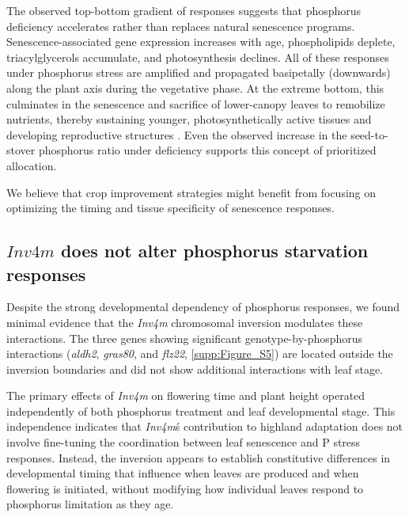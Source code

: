 \documentclass[9pt,twocolumn,twoside]{rilabRxiv}
\newcommand{\invfour}{\textit{Inv4m}\xspace}
\begin{document}
The observed top-bottom gradient of responses suggests that phosphorus deficiency accelerates rather than replaces natural senescence programs. 
Senescence-associated gene expression increases with age, phospholipids deplete, triacylglycerols accumulate, and photosynthesis declines.
All of these responses under phosphorus stress are amplified and propagated basipetally (downwards) along the plant axis during the vegetative phase. 
At the extreme bottom, this culminates in the senescence and sacrifice of lower-canopy leaves to remobilize nutrients, thereby sustaining younger, photosynthetically active tissues and developing reproductive structures \cite{wei2025}.
Even the observed increase in the seed-to-stover phosphorus ratio under deficiency supports this concept of prioritized allocation. 

We believe that crop improvement strategies might benefit from focusing on optimizing the timing and tissue specificity of senescence responses.


\subsection*{$\invfour$ does not alter phosphorus starvation responses}

Despite the strong developmental dependency of phosphorus responses, we found minimal evidence that the \invfour chromosomal inversion modulates these interactions.
The three genes showing significant genotype-by-phosphorus interactions (\textit{aldh2}, \textit{gras80}, and \textit{flz22}, \ref{supp:Figure_S5}) are located outside the inversion boundaries and did not show additional interactions with leaf stage.

The primary effects of \invfour on flowering time and plant height operated independently of both phosphorus treatment and leaf developmental stage.
This independence indicates that \invfour\'s contribution to highland adaptation does not involve fine-tuning the coordination between leaf senescence and P stress responses.
Instead, the inversion appears to establish constitutive differences in developmental timing that influence when leaves are produced and when flowering is initiated, without modifying how individual leaves respond to phosphorus limitation as they age.
\end{document}
